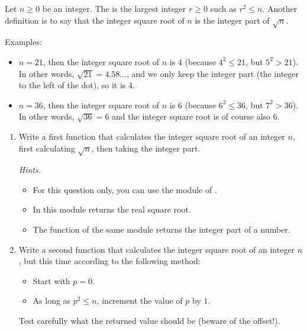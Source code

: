 \documentclass[11pt,class=report,crop=false]{standalone}
\begin{document}

\begin{activite}



Let $n \ge 0$ be an integer. 
The  is the largest integer $r\ge0$ such as $r^2 \le  n$. 
Another definition is to say that the integer square root of $n$ is the integer part of $\sqrt{n}$.

Examples:
\begin{itemize}
  \item $n=21$, then the integer square root of $n$ is $4$ (because $4^2 \le 21$, but $5^2 > 21$). In other words, $\sqrt{21} = 4.58\ldots$, and we only keep the integer part (the integer to the left of the dot), so it is $4$.
  
  \item $n=36$, then the integer square root of $n$ is $6$ (because $6^2 \le 36$, but $7^2 > 36$). In other words, $\sqrt{36} = 6$ and the integer square root is of course also $6$.    
\end{itemize}

\begin{enumerate}
  \item Write a first function that calculates the integer square root of an integer $n$, first calculating $\sqrt{n}$, then taking the integer part.
  
  \emph{Hints.}
  \begin{itemize}
    \item For this question only, you can use the module  of \Python. 
    \item In this module  returns the real square root.
    \item The function  of the same module returns the integer part of a number.
  \end{itemize}
  
  \item Write a second function that calculates the integer square root of an integer $n$, but this time according to the following method:
  \begin{itemize}
    \item Start with $p=0$.
    \item As long as $p^2 \le n$, increment the value of $p$ by $1$.
  \end{itemize}
  Test carefully what the returned value should be (beware of the offset!).
  

\end{enumerate}
\end{activite}
\end{document}
